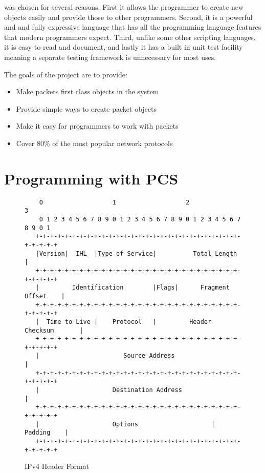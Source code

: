 \documentclass[11pt]{article}
\begin{document}
 was chosen for several reasons.  First it allows the
programmer to create new objects easily and provide those to other
programmers.  Second, it is a powerful and and fully expressive
language that has all the programming language features that modern
programmers expect.  Third, unlike some other scripting languages, it
is easy to read and document, and lastly it has a built in unit test
facility meaning a separate testing framework is unnecessary for most
uses.

The goals of the  project are to provide:

\begin{itemize}
\item Make packets first class objects in the system
\item Provide simple ways to create packet objects
\item Make it easy for programmers to work with packets
\item Cover $80\%$ of the most popular network protocols
\end{itemize}

\newpage
\section{Programming with PCS}
\label{sec:programming-with-pcs}

\begin{figure}[t]
  \centering
\begin{verbatim}
    0                   1                   2                   3   
    0 1 2 3 4 5 6 7 8 9 0 1 2 3 4 5 6 7 8 9 0 1 2 3 4 5 6 7 8 9 0 1 
   +-+-+-+-+-+-+-+-+-+-+-+-+-+-+-+-+-+-+-+-+-+-+-+-+-+-+-+-+-+-+-+-+
   |Version|  IHL  |Type of Service|          Total Length         |
   +-+-+-+-+-+-+-+-+-+-+-+-+-+-+-+-+-+-+-+-+-+-+-+-+-+-+-+-+-+-+-+-+
   |         Identification        |Flags|      Fragment Offset    |
   +-+-+-+-+-+-+-+-+-+-+-+-+-+-+-+-+-+-+-+-+-+-+-+-+-+-+-+-+-+-+-+-+
   |  Time to Live |    Protocol   |         Header Checksum       |
   +-+-+-+-+-+-+-+-+-+-+-+-+-+-+-+-+-+-+-+-+-+-+-+-+-+-+-+-+-+-+-+-+
   |                       Source Address                          |
   +-+-+-+-+-+-+-+-+-+-+-+-+-+-+-+-+-+-+-+-+-+-+-+-+-+-+-+-+-+-+-+-+
   |                    Destination Address                        |
   +-+-+-+-+-+-+-+-+-+-+-+-+-+-+-+-+-+-+-+-+-+-+-+-+-+-+-+-+-+-+-+-+
   |                    Options                    |    Padding    |
   +-+-+-+-+-+-+-+-+-+-+-+-+-+-+-+-+-+-+-+-+-+-+-+-+-+-+-+-+-+-+-+-+
\end{verbatim}
  \caption{IPv4 Header Format}
  \label{fig:rfc791-header}
\end{figure}
\end{document}
